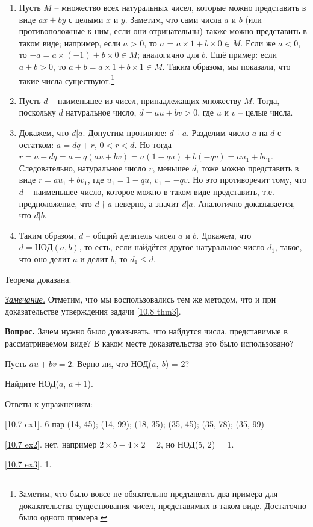 \begin{enumerate}[itemsep=0.05em]
    \item Пусть $M$ -- множество всех натуральных чисел, которые можно представить в виде $ax + by$ с целыми $x$ и $y$. Заметим, что сами числа $a$ и $b$ (или противоположные к ним, если они отрицательны) также можно представить в таком виде; например, если $a$ > 0, то $a$ = $a \times 1 + b \times 0 \in M$. Если же $a < 0$, то $-a = a \times (-1) + b \times 0 \in M$; аналогично для $b$. Ещё пример: если $a + b > 0$, то $a + b=a \times 1 + b \times 1 \in M$. Таким образом, мы показали, что такие числа существуют.\footnote{Заметим, что было вовсе не обязательно предъявлять два примера для доказательства существования чисел, представимых в таком виде. Достаточно было одного примера.}
    \item Пусть $d$ -- наименьшее из чисел, принадлежащих множеству $M$. Тогда, поскольку $d$ натуральное число, $d = au + bv > 0$, где $u$ и $v$ -- целые числа.
    \item Докажем, что $d | a$. Допустим противное: $d \dag a$. Разделим число $a$ на $d$ с остатком: $a = dq + r$, $0 < r < d$. Но тогда $r = a - dq = a - q(au + bv) = a(1 - qu) + b(-qv) = au_1+ bv_1$.
    \\ Следовательно, натуральное число $r$, меньшее $d$, тоже можно представить в виде $r = au_1 + bv_1$, где $u_1 = 1 - qu$, $v_1 = -qv$. Но это противоречит тому, что $d$ -- наименьшее число, которое можно в таком виде представить, т.е. предположение, что $d \dag a$ неверно, а значит $d | a$. Аналогично доказывается, что $d | b$.
    \item Таким образом, $d$ -- общий делитель чисел $a$ и $b$. Докажем, что $d = НОД(a, b)$, то есть, если найдётся другое натуральное число $d_1$, такое, что оно делит $a$ и делит $b$, то $d_1 \leq d$.
\end{enumerate}
Теорема доказана. \hfill \qedsymbol

\textit{\underline{Замечание.}} Отметим, что мы воспользовались тем же методом, что и при доказательстве утверждения задачи \ref{10.8 thm3}.

\textbf{Вопрос.} Зачем нужно было доказывать, что найдутся числа, представимые в рассматриваемом виде? В каком месте доказательства это было использовано?

\begin{ex} \label{10.7 ex2}
    Пусть $au + bv = 2$. Верно ли, что НОД($a,~b$) = 2?
\end{ex}

\begin{ex} \label{10.7 ex3}
    Найдите НОД($a$, $a + 1$).
\end{ex}

Ответы к упражнениям:

\par
\ref{10.7 ex1}. 6 пар (14, 45); (14, 99); (18, 35); (35, 45); (35, 78); (35, 99)
\par
\ref{10.7 ex2}. нет, например $2 \times 5 - 4 \times 2 = 2$, но НОД(5, 2) = 1. 
\par
\ref{10.7 ex3}. 1.